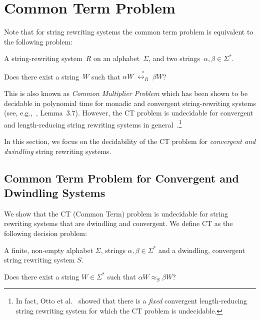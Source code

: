 \documentclass{lmcs} %
\theoremstyle{plain}\newtheorem{satz}[thm]{Satz} %
\begin{document}

\section{Common Term Problem}

Note that for string rewriting systems the common term problem is
equivalent to the following problem: \medskip

\begin{description}[align=left]
  \item[Input] A string-rewriting system~$R$ on an alphabet~$\Sigma$,
and two strings~$\alpha, \beta \in \Sigma_{}^*$.
  \item[Question] Does there exist a string~$W$ such that $\alpha W \;
\stackrel{*}{{\longleftrightarrow}_R} \; \beta W$?
\end{description} \medskip

This is also known as \textit{Common Multiplier Problem} which has
been shown to be decidable in polynomial time for monadic and
convergent string-rewriting systems (see, e.g.,~\cite{OND98},
Lemma~3.7).  However, the CT problem is undecidable for convergent and
length-reducing string rewriting systems in
general~\cite{Otto1986}.\footnote{ In fact, Otto et al.~\cite{OND98}
showed that there is a \emph{fixed} convergent length-reducing string
rewriting system for which the CT problem is undecidable.}

In this section, we focus on the decidability of the CT problem for
\emph{convergent and dwindling} string rewriting systems. 

\subsection{Common Term Problem for Convergent and Dwindling Systems}\label{ctdwindling} We show that
the CT (Common Term) problem is undecidable for string rewriting
systems that are dwindling and convergent. We define CT as the
following decision problem: \medskip

\begin{description}[align=left]
  \item[Given] A finite, non-empty alphabet $\Sigma$, strings $\alpha,
\beta \in \Sigma^*$ and a dwindling, convergent string rewriting
system $S$.
  \item[Question] Does there exist a string $W \in \Sigma^*$ such that
$\alpha W \approx_S^{} \beta W$?
\end{description} \medskip
\end{document}
